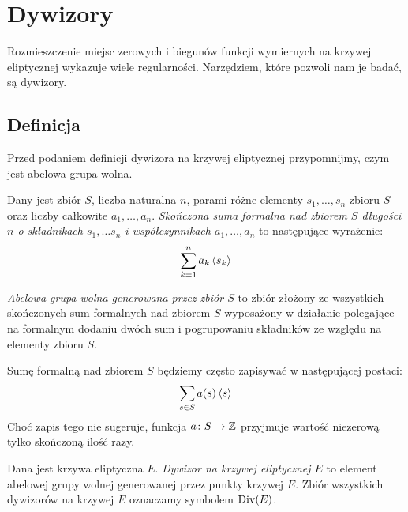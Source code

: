 \section{Dywizory}

\noindent
Rozmieszczenie miejsc zerowych i biegunów
funkcji wymiernych na krzywej eliptycznej
wykazuje wiele regularności.
Narzędziem, które pozwoli nam je badać, są dywizory.

\subsection*{Definicja}

\noindent
Przed podaniem definicji dywizora na krzywej eliptycznej przypomnijmy,
czym jest abelowa grupa wolna.

\begin{definition}
Dany jest zbiór $S$,
liczba naturalna $n$,
parami różne elementy $s_1, \ldots, s_n$ zbioru $S$
oraz liczby całkowite $a_1, \ldots, a_n$.
\emph{Skończona suma formalna nad zbiorem $S$ długości $n$
o składnikach $s_1, \ldots s_n$ i współczynnikach $a_1, \ldots, a_n$}
to następujące wyrażenie:
\begin{equation*}
\sum_{k=1}^n a_k\left\langle s_k\right\rangle
\end{equation*}

\noindent
\emph{Abelowa grupa wolna generowana przez zbiór $S$}
to zbiór złożony ze wszystkich skończonych sum formalnych nad zbiorem $S$
wyposażony w działanie polegające na formalnym dodaniu dwóch sum
i pogrupowaniu składników ze względu na elementy zbioru $S$.
\end{definition}

\begin{remark}\label{formal_sum_notation_remark}
Sumę formalną nad zbiorem $S$ będziemy często zapisywać
w następującej postaci:
\begin{equation*}
\sum_{s \in S}a(s)\left\langle s\right\rangle
\end{equation*}
Choć zapis tego nie sugeruje,
funkcja $a \colon S \to \mathbb{Z}$ przyjmuje wartość niezerową
tylko skończoną ilość razy.
\end{remark}

\begin{definition}
Dana jest krzywa eliptyczna $E$.
\emph{Dywizor na krzywej eliptycznej $E$}
to element abelowej grupy wolnej generowanej przez punkty krzywej $E$.
Zbiór wszystkich dywizorów na krzywej $E$ oznaczamy symbolem $\operatorname{Div}(E)$.
\end{definition}


